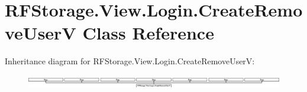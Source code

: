 \hypertarget{class_r_f_storage_1_1_view_1_1_login_1_1_create_remove_user_v}{}\section{R\+F\+Storage.\+View.\+Login.\+Create\+Remove\+UserV Class Reference}
\label{class_r_f_storage_1_1_view_1_1_login_1_1_create_remove_user_v}
Inheritance diagram for R\+F\+Storage.\+View.\+Login.\+Create\+Remove\+UserV\+:\begin{figure}[H]
\begin{center}
\leavevmode
\includegraphics[height=0.594796cm]{class_r_f_storage_1_1_view_1_1_login_1_1_create_remove_user_v}
\end{center}
\end{figure}
